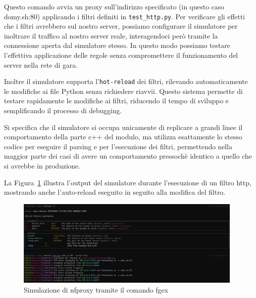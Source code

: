 Questo comando avvia un proxy sull'indirizzo specificato (in questo caso domy.sh:80) applicando i filtri definiti in \texttt{test\_http.py}.
Per verificare gli effetti che i filtri avrebbero sul nostro server, possiamo configurare il simulatore per inoltrare il traffico al nostro server reale, interagendoci però tramite la connessione aperta dal simulatore stesso. In questo modo possiamo testare l'effettiva applicazione delle regole senza compromettere il funzionamento del server nella rete di gara.  

Inoltre il simulatore supporta l'\texttt{hot-reload} dei filtri, rilevando automaticamente le modifiche ai file Python senza richiedere riavvii. Questo sistema permette di testare rapidamente le modifiche ai filtri, riducendo il tempo di sviluppo e semplificando il processo di debugging.

Si specifica che il simulatore si occupa unicamente di replicare a grandi linee il comportamento della parte c++ del modulo, ma utilizza esattamente lo stesso codice per eseguire il parsing e per l'esecuzione dei filtri, permettendo nella maggior parte dei casi di avere un comportamento pressochè identico a quello che si avrebbe in produzione.

La Figura~\ref{fig:nfproxy_sim} illustra l'output del simulatore durante l'esecuzione di un filtro http, mostrando anche l'auto-reload eseguito in seguito alla modifica del filtro.

\begin{figure}[H]
    \centering
    \includegraphics[width=0.98\textwidth]{images/chapter3/nfproxy_sim.png}
    \caption{Simulazione di nfproxy tramite il comando fgex}\label{fig:nfproxy_sim}
\end{figure}

